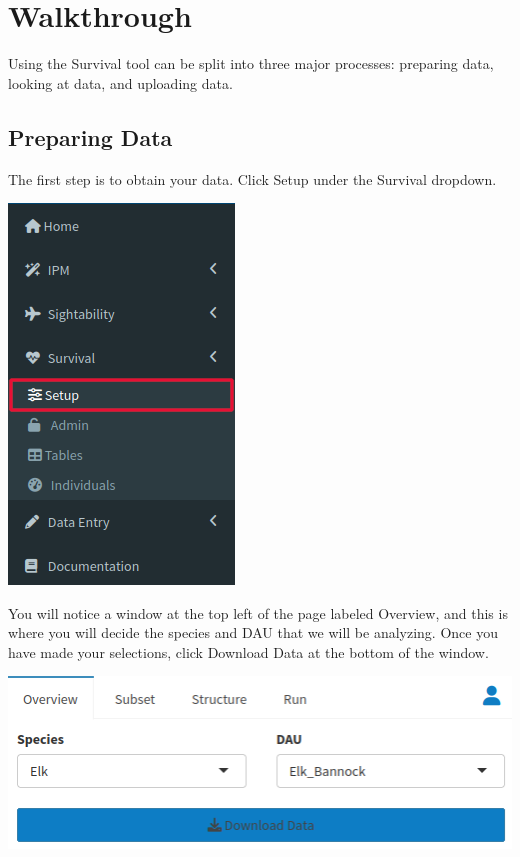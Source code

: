 \documentclass[
]{book}
\begin{document}
\hypertarget{surv-walk}{%
\section{Walkthrough}\label{surv-walk}}

Using the Survival tool can be split into three major processes: preparing data, looking at data, and uploading data.

\hypertarget{surv-prep}{%
\subsection{Preparing Data}\label{surv-prep}}

The first step is to obtain your data. Click Setup under the Survival dropdown.

\includegraphics{./www/surv_walk1.png}

You will notice a window at the top left of the page labeled Overview, and this is where you will decide the species and DAU that we will be analyzing. Once you have made your selections, click {Download Data} at the bottom of the window.

\includegraphics{./www/surv_walk2.png}
\end{document}
